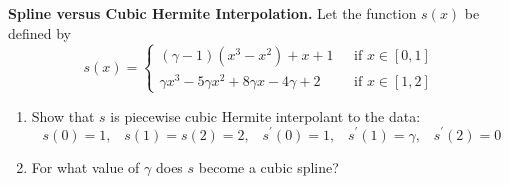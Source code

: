 \textbf{Spline versus Cubic Hermite Interpolation.} Let the function
$s(x)$ be defined by
\[
s(x) = \left\{
\begin{aligned}
(\gamma - 1)(x^3 - x^2) + x + 1 &\,\,\,\, \text{if}\,\, x\in [0,1] \\
\gamma x^3 - 5 \gamma x^2 + 8 \gamma x - 4 \gamma + 2 &\,\,\,\, \text{if}\,\, x\in [1,2]
\end{aligned}
\right.
\]

\begin{enumerate}
\item Show that $s$ is piecewise cubic Hermite interpolant to the
  data:
\[
s(0)=1, \;\;\; s(1)=s(2)=2, \;\;\; s^\prime(0)=1, \;\;\; s^\prime(1) =
\gamma, \;\;\; s^\prime(2)=0
\]
\item For what value of $\gamma$ does $s$ become a cubic spline?
\end{enumerate}
